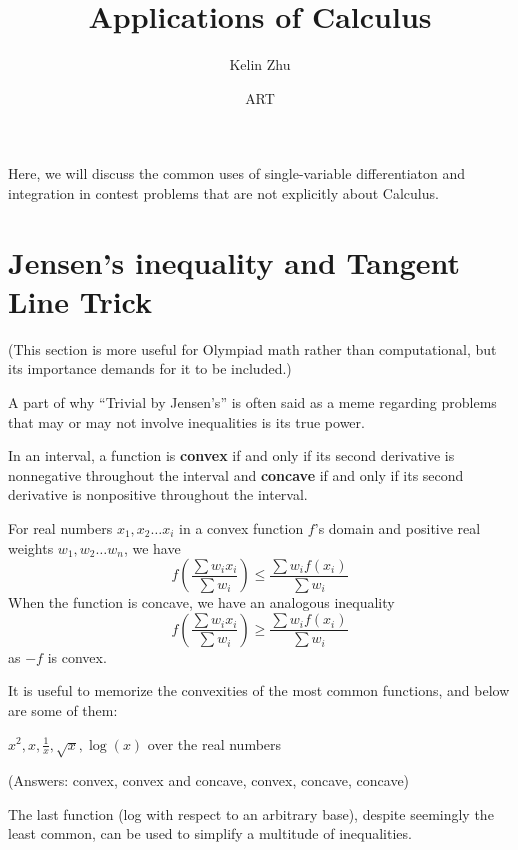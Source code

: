 \documentclass[mast]{lucky}
\title{Applications of Calculus}
\author{Kelin Zhu}
\date{ART}
\begin{document}
\maketitle
Here, we will discuss the common uses of single-variable differentiaton and integration in contest problems that are not explicitly about Calculus.
\section{Jensen's inequality and Tangent Line Trick}
(This section is more useful for Olympiad math rather than computational, but its importance demands for it to be included.)

A part of why ``Trivial by Jensen's'' is often said as a meme regarding problems that may or may not involve inequalities is its true power.
\begin{theo}
In an interval, a function is \textbf{convex} if and only if its second derivative is nonnegative throughout the interval and \textbf{concave} if and only if its second derivative is nonpositive throughout the interval.

For real numbers $x_1,x_2\ldots x_i$ in a convex function $f$'s domain and positive real weights $w_1,w_2\ldots w_n$, we have
$$f\left(\frac{\sum w_i x_i}{\sum w_i}\right)\le \frac{\sum w_i f(x_i)}{\sum w_i}$$
When the function is concave, we have an analogous inequality
$$f\left(\frac{\sum w_i x_i}{\sum w_i}\right)\ge \frac{\sum w_i f(x_i)}{\sum w_i}$$
as $-f$ is convex.
\end{theo}

It is useful to memorize the convexities of the most common functions, and below are some of them:
\begin{exer}
$x^2, x, \frac{1}{x}, \sqrt{x}, \log(x)$ over the real numbers

(Answers: convex, convex and concave, convex, concave, concave)
\end{exer}

The last function (log with respect to an arbitrary base), despite seemingly the least common, can be used to simplify a multitude of inequalities.
\end{document}
